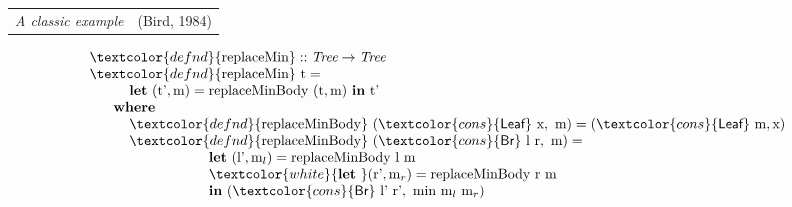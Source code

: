 \documentclass[xetex,serif,mathserif]{beamer}
\newenvironment{slide}[1]{\begin{frame}\frametitle{#1}}{\end{frame}}
\newcommand{\cons}[1]{\textcolor{cons}{\textsf{#1}}}
\newcommand{\kw}[1]{\textbf{#1}}
\newcommand{\tyname}[1]{\textit{#1}}
\newcommand{\ident}[1]{\textrm{#1}}
\newcommand{\defn}[1]{\textcolor{defnd}{\textrm{#1}}}
\begin{document}

\begin{slide}{}
  \begin{tabular*}{1.0\textwidth}{@{\extracolsep{\fill}}lr}
    \textcolor{titlered}{\emph{A classic example}}
    &
    \textcolor{black!60}{(Bird, 1984)}
  \end{tabular*}
  
  \begin{displaymath}
    \begin{array}{l}
      \defn{replaceMin} :: \tyname{Tree} \to \tyname{Tree} \\
      \defn{replaceMin}\ \ident{t} = \\
      \hspace{1cm} \kw{let}\ (\ident{t’}, \ident{m}) = \ident{replaceMinBody}\ (\ident{t}, \ident{m})\ \kw{in}\ \ident{t’} \\
      \hspace{0.6cm} \kw{where} \\
      \hspace{1cm} \defn{replaceMinBody}\ (\cons{Leaf}\ \ident{x},\ \ident{m}) = (\cons{Leaf}\ \ident{m}, \ident{x}) \\
      \hspace{1cm} \defn{replaceMinBody}\ (\cons{Br}\ \ident{l}\ \ident{r},\ \ident{m}) = \\
      \hspace{3cm} \kw{let}\ (\ident{l’}, \ident{m$_l$}) = \ident{replaceMinBody}\ \ident{l}\ \ident{m} \\
      \hspace{3cm} \textcolor{white}{\kw{let}\ }(\ident{r’}, \ident{m$_r$}) = \ident{replaceMinBody}\ \ident{r}\ \ident{m} \\
      \hspace{3cm} \kw{in}\ (\cons{Br}\ \ident{l’}\ \ident{r’},\ \ident{min}\ \ident{m$_l$}\ \ident{m$_r$})
    \end{array}
  \end{displaymath}
\end{slide}
\end{document}
